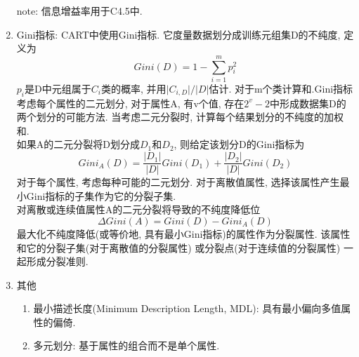\documentclass[a4paper,10pt,english]{article}
\begin{document}
\begin{enumerate}
note: 信息增益率用于C4.5中.
\item {Gini指标:}
CART中使用Gini指标. 它度量数据划分成训练元组集D的不纯度, 定义为$$ Gini(D) = 1 - \sum_{i=1}^{m}p_i^2 $$
$p_i$是D中元组属于$C_i$类的概率, 并用$\lvert C_{i,D} \rvert/\lvert D \rvert$估计. 对于m个类计算和.Gini指标考虑每个属性的二元划分, 对于属性A, 有v个值, 存在$2^v - 2$中形成数据集D的两个划分的可能方法. 当考虑二元分裂时, 计算每个结果划分的不纯度的加权和. \\
如果A的二元分裂将D划分成$D_1$和$D_2$, 则给定该划分D的Gini指标为$$ Gini_A(D) = \frac{\lvert D_1 \rvert}{\lvert D \rvert}Gini(D_1) + \frac{\lvert D_2 \rvert}{\lvert D \rvert}Gini(D_2)$$ 对于每个属性, 考虑每种可能的二元划分. 对于离散值属性, 选择该属性产生最小Gini指标的子集作为它的分裂子集.\\
对离散或连续值属性A的二元分裂将导致的不纯度降低位$$ \Delta Gini(A) = Gini(D) - Gini_A(D)$$最大化不纯度降低(或等价地, 具有最小Gini指标)的属性作为分裂属性. 该属性和它的分裂子集(对于离散值的分裂属性) 或分裂点(对于连续值的分裂属性) 一起形成分裂准则. 

\item {其他}
\begin{enumerate}
\item {最小描述长度(Minimum Description Length, MDL):}
具有最小偏向多值属性的偏倚.
\item {多元划分:}
基于属性的组合而不是单个属性.
\end{enumerate}
\end{enumerate}
\end{document}
